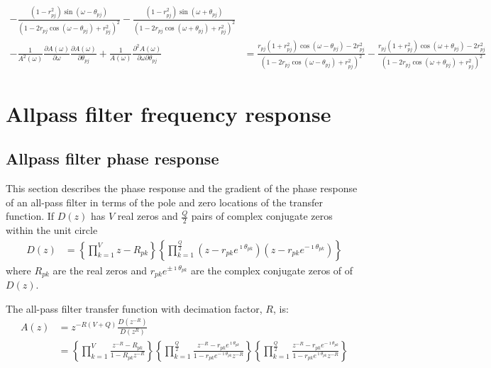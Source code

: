 \documentclass[a4paper,twoside,10pt,english]{report}
\begin{document}
\begin{align*}
-\frac{\left(1-r_{pj}^2\right)\sin\left(\omega-\theta_{pj}\right)}
{\left(1-2r_{pj}\cos\left(\omega-\theta_{pj}\right)+r_{pj}^{2}\right)^2}
-\frac{\left(1-r_{pj}^2\right)\sin\left(\omega+\theta_{pj}\right)}
{\left(1-2r_{pj}\cos\left(\omega+\theta_{pj}\right)+r_{pj}^{2}\right)^2}\\
-\frac{1}{A^{2}\left(\omega\right)}
\frac{\partial A\left(\omega\right)}{\partial\omega} 
\frac{\partial A\left(\omega\right)}{\partial \theta_{pj}}+
\frac{1}{A\left(\omega\right)}
\frac{\partial^{2} A\left(\omega\right)}{\partial\omega\partial \theta_{pj}} &=
\frac{r_{pj}\left(1+r_{pj}^2\right)\cos\left(\omega-\theta_{pj}\right)-2r_{pj}^{2}}
{\left(1-2r_{pj}\cos\left(\omega-\theta_{pj}\right)+r_{pj}^{2}\right)^2} 
-\frac{r_{pj}\left(1+r_{pj}^2\right)\cos\left(\omega+\theta_{pj}\right)-2r_{pj}^{2}}
{\left(1-2r_{pj}\cos\left(\omega+\theta_{pj}\right)+r_{pj}^{2}\right)^2}
\end{align*}
\cleardoublepage{}
\chapter{\label{app:Allpass-filter-frequency-response}Allpass filter frequency response}
\section{\label{app:Allpass-filter-phase-response}Allpass filter phase response}
This section describes the phase response and the gradient of the phase response
of an all-pass filter in terms of the pole and zero locations of the transfer 
function. If $D\left(z\right)$ has $V$ real zeros and $\frac{Q}{2}$ pairs of 
complex conjugate zeros within the unit circle
\begin{align*}
  D\left(z\right)&=\left\{\prod^{V}_{k=1}z-R_{pk}\right\}
  \left\{\prod^{\frac{Q}{2}}_{k=1}
  \left(z-r_{pk}e^{\imath\theta_{pk}}\right)
  \left(z-r_{pk}e^{-\imath\theta_{pk}}\right)\right\}
\end{align*}
where $R_{pk}$ are the real zeros and $r_{pk}e^{\pm\imath\theta_{pk}}$ are the complex
conjugate zeros of of $D\left(z\right)$.

The all-pass filter transfer function with decimation factor, $R$, is:
\begin{align*}
A\left(z\right)
  &=z^{-R\left(V+Q\right)}\frac{D\left(z^{-R}\right)}{D\left(z^{R}\right)}\\
  &=\left\{\prod^{V}_{k=1}\frac{z^{-R}-R_{pk}}{1-R_{pk}z^{-R}}\right\}
  \left\{\prod^{\frac{Q}{2}}_{k=1}
    \frac{z^{-R}-r_{pk}e^{\imath\theta_{pk}}}{1-r_{pk}e^{-\imath\theta_{pk}}z^{-R}}\right\}
  \left\{\prod^{\frac{Q}{2}}_{k=1}
  \frac{z^{-R}-r_{pk}e^{-\imath\theta_{pk}}}{1-r_{pk}e^{\imath\theta_{pk}}z^{-R}}\right\}
\end{align*}
\end{document}
